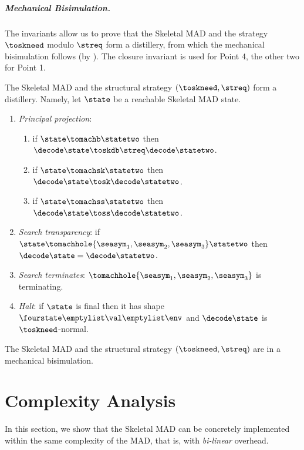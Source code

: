 \subparagraph{Mechanical Bisimulation.} The invariants allow us to prove that the Skeletal MAD and the strategy $\toskneed$ modulo $\streq$ form a distillery, from which the mechanical bisimulation follows (by ). The closure invariant is used for Point 4, the other two for Point 1.
\begin{toappendix}
\begin{theorem}
\label{thm:SkMAD-properties}
The Skeletal MAD and the structural strategy $(\toskneed,\streq)$ form a distillery. Namely, let $\state$ be a reachable Skeletal MAD state.
\begin{enumerate}
\item \emph{Principal projection}: 
\begin{enumerate}
\item if $\state \tomachb \statetwo$ then $\decode\state \toskdb\streq \decode\statetwo$.
\item if $\state \tomachsk \statetwo$ then $\decode\state \tosk \decode\statetwo$.
\item if $\state \tomachss \statetwo$ then $\decode\state \toss \decode\statetwo$.
\end{enumerate}

\item \emph{Search transparency}: if $\state \tomachhole{\seasym_1,\seasym_2,\seasym_3} \statetwo$ then $\decode\state = \decode\statetwo$.

\item \emph{Search terminates}: $\tomachhole{\seasym_1,\seasym_2,\seasym_3}$ is terminating.

\item \emph{Halt}: if $\state$ is final then it has shape $\fourstate\emptylist\val\emptylist\env$ and $\decode\state$ is $\toskneed$-normal.

\end{enumerate}
\end{theorem}
\end{toappendix}

\begin{corollary}
The Skeletal MAD and the structural strategy $(\toskneed,\streq)$ are in a mechanical bisimulation.
\end{corollary}


\section{Complexity Analysis}
\label{sect:complexity}
In this section, we show that the Skeletal MAD can be concretely implemented within the same complexity of the MAD, that is, with \emph{bi-linear} overhead.

